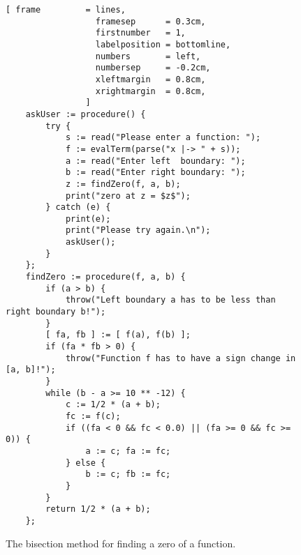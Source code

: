 \begin{figure}[!ht]
\centering
\begin{Verbatim}[ frame         = lines, 
                  framesep      = 0.3cm, 
                  firstnumber   = 1,
                  labelposition = bottomline,
                  numbers       = left,
                  numbersep     = -0.2cm,
                  xleftmargin   = 0.8cm,
                  xrightmargin  = 0.8cm,
                ]
    askUser := procedure() {
        try {
            s := read("Please enter a function: ");
            f := evalTerm(parse("x |-> " + s));
            a := read("Enter left  boundary: ");
            b := read("Enter right boundary: ");
            z := findZero(f, a, b);
            print("zero at z = $z$");
        } catch (e) {
            print(e);
            print("Please try again.\n");
            askUser();
        }
    };
    findZero := procedure(f, a, b) {
        if (a > b) {
            throw("Left boundary a has to be less than right boundary b!");   
        }
        [ fa, fb ] := [ f(a), f(b) ]; 
        if (fa * fb > 0) {
            throw("Function f has to have a sign change in [a, b]!");
        }
        while (b - a >= 10 ** -12) {
            c := 1/2 * (a + b);
            fc := f(c); 
            if ((fa < 0 && fc < 0.0) || (fa >= 0 && fc >= 0)) {
                a := c; fa := fc; 
            } else {
                b := c; fb := fc; 
            }
        }
        return 1/2 * (a + b);
    };
\end{Verbatim}
\vspace*{-0.3cm}
\caption{The bisection method for finding a zero of a function.}
\label{fig:bisection-exception.stlx}
\end{figure}
 
